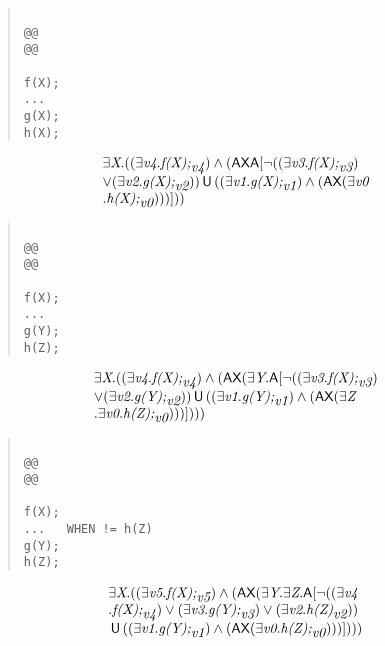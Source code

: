 \documentclass{article}
\newcommand{\U}{\,\mbox{\sf{U}}\,}
\newcommand{\A}{\mbox{\sf{A}}}
\newcommand{\AX}{\mbox{\sf{AX}}}
\newcommand{\mita}[1]{\mbox{\it{{#1}}}}
\begin{document}
\begin{quote}\begin{verbatim}

@@
@@

f(X);
...
g(X);
h(X);
\end{verbatim}\end{quote}

\[\begin{array}{l}
\exists \mita{X} . ((\exists \mita{v4} . \mita{f(X);}_{\mita{v4}}) \wedge (\AX\A[\neg ((\exists \mita{v3} . \mita{f(X);}_{\mita{v3}})\\ \vee (\exists \mita{v2} . \mita{g(X);}_{\mita{v2}})) \U ((\exists \mita{v1} . \mita{g(X);}_{\mita{v1}}) \wedge (\AX(\exists \mita{v0}\\ . \mita{h(X);}_{\mita{v0}})))]
))
\end{array}\]

\begin{quote}\begin{verbatim}

@@
@@

f(X);
...
g(Y);
h(Z);
\end{verbatim}\end{quote}

\[\begin{array}{l}
\exists \mita{X} . ((\exists \mita{v4} . \mita{f(X);}_{\mita{v4}}) \wedge (\AX(\exists \mita{Y} . \A[\neg ((\exists \mita{v3} . \mita{f(X);}_{\mita{v3}})\\ \vee (\exists \mita{v2} . \mita{g(Y);}_{\mita{v2}})) \U ((\exists \mita{v1} . \mita{g(Y);}_{\mita{v1}}) \wedge (\AX(\exists \mita{Z}\\ . \exists \mita{v0} . \mita{h(Z);}_{\mita{v0}})))]
)))
\end{array}\]

\begin{quote}\begin{verbatim}

@@
@@

f(X);
...   WHEN != h(Z)
g(Y);
h(Z);
\end{verbatim}\end{quote}

\[\begin{array}{l}
\exists \mita{X} . ((\exists \mita{v5} . \mita{f(X);}_{\mita{v5}}) \wedge (\AX(\exists \mita{Y} . \exists \mita{Z} . \A[\neg ((\exists \mita{v4}\\ . \mita{f(X);}_{\mita{v4}}) \vee (\exists \mita{v3} . \mita{g(Y);}_{\mita{v3}}) \vee (\exists \mita{v2} . \mita{h(Z)}_{\mita{v2}}))\\ \U ((\exists \mita{v1} . \mita{g(Y);}_{\mita{v1}}) \wedge (\AX(\exists \mita{v0} . \mita{h(Z);}_{\mita{v0}})))]
)))
\end{array}\]
\end{document}
